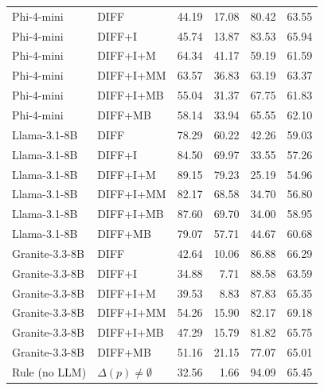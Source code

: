 \documentclass[a4paper,fleqn]{cas-dc}
\begin{document}
\begin{table}[t]
\begin{tabular}{llrrrr}
Phi-4-mini & DIFF & 44.19 & 17.08 & 80.42 & 63.55 \\
Phi-4-mini & DIFF+I & 45.74 & 13.87 & 83.53 & 65.94 \\
Phi-4-mini & DIFF+I+M & 64.34 & 41.17 & 59.19 & 61.59 \\
Phi-4-mini & DIFF+I+MM & 63.57 & 36.83 & 63.19 & 63.37 \\
Phi-4-mini & DIFF+I+MB & 55.04 & 31.37 & 67.75 & 61.83 \\
Phi-4-mini & DIFF+MB & 58.14 & 33.94 & 65.55 & 62.10 \\
Llama-3.1-8B & DIFF & 78.29 & 60.22 & 42.26 & 59.03 \\
Llama-3.1-8B & DIFF+I & 84.50 & 69.97 & 33.55 & 57.26 \\
Llama-3.1-8B & DIFF+I+M & 89.15 & 79.23 & 25.19 & 54.96 \\
Llama-3.1-8B & DIFF+I+MM & 82.17 & 68.58 & 34.70 & 56.80 \\
Llama-3.1-8B & DIFF+I+MB & 87.60 & 69.70 & 34.00 & 58.95 \\
Llama-3.1-8B & DIFF+MB & 79.07 & 57.71 & 44.67 & 60.68 \\
Granite-3.3-8B & DIFF & 42.64 & 10.06 & 86.88 & 66.29 \\
Granite-3.3-8B & DIFF+I & 34.88 & 7.71 & 88.58 & 63.59 \\
Granite-3.3-8B & DIFF+I+M & 39.53 & 8.83 & 87.83 & 65.35 \\
Granite-3.3-8B & DIFF+I+MM & 54.26 & 15.90 & 82.17 & 69.18 \\
Granite-3.3-8B & DIFF+I+MB & 47.29 & 15.79 & 81.82 & 65.75 \\
Granite-3.3-8B & DIFF+MB & 51.16 & 21.15 & 77.07 & 65.01 \\
\midrule
Rule (no LLM) & $\Delta(p)\neq\emptyset$ & 32.56 & 1.66 & 94.09 & 65.45 \\
\bottomrule
\end{tabular}
\end{table}
\FloatBarrier


\end{document}
